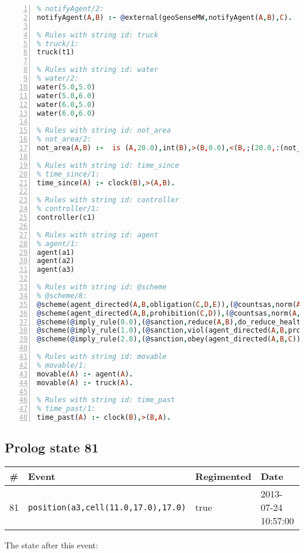 \documentclass[11pt]{article}\usepackage[utf8]{inputenc}\usepackage{geometry}
\begin{document}
\begin{lstlisting}[language=Prolog, numbers=left]
% Rules with string id: notifyAgent
% notifyAgent/2:
notifyAgent(A,B) :- @external(geoSenseMW,notifyAgent(A,B),C).

% Rules with string id: truck
% truck/1:
truck(t1)

% Rules with string id: water
% water/2:
water(5.0,5.0)
water(5.0,6.0)
water(6.0,5.0)
water(6.0,6.0)

% Rules with string id: not_area
% not_area/2:
not_area(A,B) :-  is (A,20.0),int(B),>(B,0.0),<(B,;(20.0,:(not_area(A,B), is (-(B),20.0)))),int(A),>(A,0.0),<(A,;(20.0,:(area(A,B),-(int(A))))),int(B),>(A,0.0),>(B,0.0),<(A,21.0),<(B,21.0).

% Rules with string id: time_since
% time_since/1:
time_since(A) :- clock(B),>(A,B).

% Rules with string id: controller
% controller/1:
controller(c1)

% Rules with string id: agent
% agent/1:
agent(a1)
agent(a2)
agent(a3)

% Rules with string id: @scheme
% @scheme/8:
@scheme(agent_directed(A,B,obligation(C,D,E)),(@countsas,norm(A,B,F,obligation(C,D,E)),F),false,(listTrue(C)),(time_past(D)),false,[plus(viol(agent_directed(A,B,obligation(C,D,E))))|[]],[plus(obey(agent_directed(A,B,obligation(C,D,E))))|[]])
@scheme(agent_directed(A,B,prohibition(C,D)),(@countsas,norm(A,B,E,prohibition(C,D)),E),(listTrue(C)),false,(false),false,[plus(viol(agent_directed(A,B,prohibition(C,D))))|[]],[plus(obey(agent_directed(A,B,prohibition(C,D))))|[]])
@scheme(@imply_rule(0.0),(@sanction,reduce(A,B),do_reduce_health(A,B),notifyAgent(A,changed(status))),true,false,false,false,[min(reduce(A,B))|[]],[])
@scheme(@imply_rule(1.0),(@sanction,viol(agent_directed(A,B,prohibition(C,D))),do_sanction(D)),true,false,false,false,[min(viol(agent_directed(A,B,prohibition(C,D))))|[]],[])
@scheme(@imply_rule(2.0),(@sanction,obey(agent_directed(A,B,C))),true,false,false,false,[min(obey(agent_directed(A,B,C)))|[]],[])

% Rules with string id: movable
% movable/1:
movable(A) :- agent(A).
movable(A) :- truck(A).

% Rules with string id: time_past
% time_past/1:
time_past(A) :- clock(B),>(B,A).

\end{lstlisting}
\clearpage 
\subsection{Prolog state 81}
\begin{table}[ht]
\centering 
\begin{tabular}{l l l l} 
\textbf{\#} & \textbf{Event} & \textbf{Regimented} & \textbf{Date} \\ [0.5ex] 
\hline
81&\texttt{position(a3,cell(11.0,17.0),17.0)}&true&2013-07-24 10:57:00\\ [1ex] \hline\end{tabular}
\end{table}
The state after this event:
\end{document}
